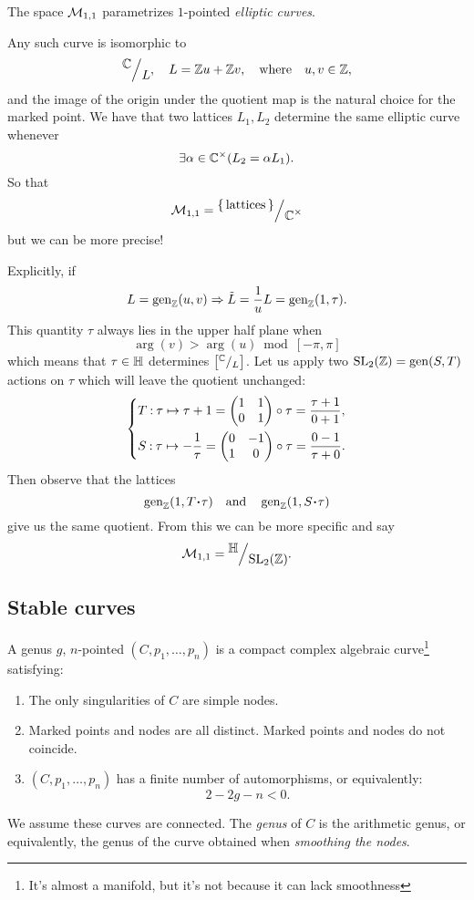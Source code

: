 \documentclass[12pt]{memoir}
\begin{document}
\begin{Ex}
    The space $\mathcal{M}_{1,1}$ parametrizes $1$-pointed \emph{elliptic curves}.\par
    Any such curve is isomorphic to 
    $$\quot{\bC}{L},\quad L=\bZ u+\bZ v,\word{where}u,v\in\bZ,$$
    and the image of the origin under the quotient map is the natural choice for the marked point. We have that two lattices $L_1,L_2$ determine the same elliptic curve whenever 
    $$\exists \alpha\in\mathbb{C}^\times(L_2=\alpha L_1).$$
    So that 
    $$\cM_{1,1}=\quot{\set{\text{lattices}}}{\bC^\x}$$
    but we can be more precise!\par
    Explicitly, if 
    $$L=\operatorname{gen}_{\mathbb{Z}}(u,v)\Rightarrow \tilde{L}=\frac{1}{u}L=\operatorname{gen}_{\mathbb{Z}}(1,\tau).$$
    This quantity $\tau$ always lies in the upper half plane when 
    $$\arg(v)>\arg(u)\bmod[-\pi,\pi]$$
    which means that $\tau\in\mathbb{H}$ determines $\bonj{\quot{\bC}{L}}$. 
    Let us apply two $\mathrm{SL}_2(\mathbb{Z})=\operatorname{gen}(S,T)$ actions on $\tau$ which will leave the quotient unchanged:
    $$
    \left\lbrace
    \begin{aligned}
        &T\mathbin{:}\tau\mapsto\tau+1=\begin{pmatrix} 1 & 1 \\ 0 & 1 \end{pmatrix}\circ\tau=\frac{\tau+1}{0+1},\\
        &S\mathbin{:}\tau\mapsto-\frac1\tau=\begin{pmatrix} 0 & -1 \\ 1 & 0 \end{pmatrix}\circ\tau=\frac{0-1}{\tau+0}.
    \end{aligned}
    \right.
    $$
    Then observe that the lattices
    $$\gen_\bZ(1,T\.\tau)\word{and}\gen_\bZ(1,S\.\tau)$$
    give us the same quotient. From this we can be more specific and say 
    $$\cM_{1,1}=\quot{\bH}{\rSL_2(\bZ)}.$$
\end{Ex}

\subsection{Stable curves}

\begin{Def}
    A genus $g$, $n$-pointed  $(C,p_1,\dots,p_n)$ is a compact complex algebraic curve\footnote{It's almost a manifold, but it's not because it can lack smoothness} satisfying:
    \begin{enumerate}
        \item The only singularities of $C$ are simple nodes.
        \item Marked points and nodes are all distinct. Marked points and nodes do not coincide.
        \item\label{fin-number-auts} $(C,p_1,\dots,p_n)$ has a finite number of automorphisms, or equivalently:
        $$2-2g-n<0.$$
    \end{enumerate}
    We assume these curves are connected. The \emph{genus} of $C$ is the arithmetic genus, or equivalently, the genus of the curve obtained when \emph{smoothing the nodes}.
\end{Def}
\end{document}
